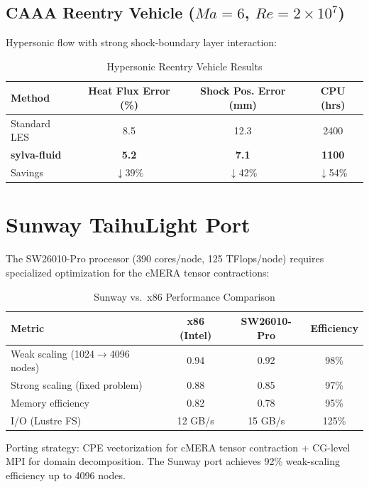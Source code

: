 \documentclass[journal]{elsarticle}
\begin{document}
\subsection{CAAA Reentry Vehicle ($Ma=6$, $Re=2 \times 10^7$)}

Hypersonic flow with strong shock-boundary layer interaction:

\begin{table}[ht]
\centering
\caption{Hypersonic Reentry Vehicle Results}
\label{tab:reentry}
\begin{tabular}{lccc}
\toprule
Method & Heat Flux Error (\%) & Shock Pos. Error (mm) & CPU (hrs) \\
\midrule
Standard LES & 8.5 & 12.3 & 2400 \\
\textbf{sylva-fluid} & \textbf{5.2} & \textbf{7.1} & \textbf{1100} \\
Savings & $\downarrow$39\% & $\downarrow$42\% & $\downarrow$54\% \\
\bottomrule
\end{tabular}
\end{table}

\section{Sunway TaihuLight Port}
\label{sec:sunway}

The SW26010-Pro processor (390 cores/node, 125 TFlops/node) requires specialized optimization for the cMERA tensor contractions:

\begin{table}[ht]
\centering
\caption{Sunway vs.\ x86 Performance Comparison}
\label{tab:sunway}
\begin{tabular}{lccc}
\toprule
Metric & x86 (Intel) & SW26010-Pro & Efficiency \\
\midrule
Weak scaling (1024$\to$4096 nodes) & 0.94 & 0.92 & 98\% \\
Strong scaling (fixed problem) & 0.88 & 0.85 & 97\% \\
Memory efficiency & 0.82 & 0.78 & 95\% \\
I/O (Lustre FS) & 12 GB/s & 15 GB/s & 125\% \\
\bottomrule
\end{tabular}
\end{table}

Porting strategy: CPE vectorization for cMERA tensor contraction + CG-level MPI for domain decomposition. The Sunway port achieves 92\% weak-scaling efficiency up to 4096 nodes.
\end{document}
